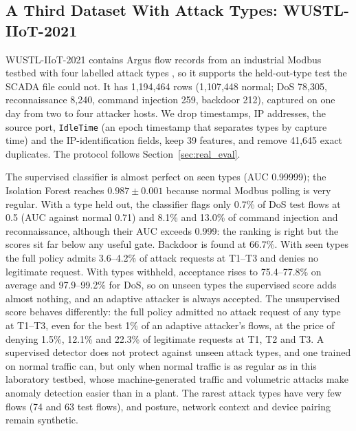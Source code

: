 \subsection{A Third Dataset With Attack Types: WUSTL-IIoT-2021}\label{sec:wustl21_eval}
WUSTL-IIoT-2021 contains Argus flow records from an industrial Modbus testbed with four labelled attack types \cite{zolanvari2019vulnerability,zolanvari2021wustl}, so it supports the held-out-type test the SCADA file could not. It has 1{,}194{,}464 rows (1{,}107{,}448 normal; DoS 78{,}305, reconnaissance 8{,}240, command injection 259, backdoor 212), captured on one day from two to four attacker hosts. We drop timestamps, IP addresses, the source port, \texttt{IdleTime} (an epoch timestamp that separates types by capture time) and the IP-identification fields, keep 39 features, and remove 41{,}645 exact duplicates. The protocol follows Section~\ref{sec:real_eval}.

The supervised classifier is almost perfect on seen types (AUC 0.99999); the Isolation Forest reaches $0.987\pm0.001$ because normal Modbus polling is very regular. With a type held out, the classifier flags only 0.7\% of DoS test flows at 0.5 (AUC against normal 0.71) and 8.1\% and 13.0\% of command injection and reconnaissance, although their AUC exceeds 0.999: the ranking is right but the scores sit far below any useful gate. Backdoor is found at 66.7\%. With seen types the full policy admits 3.6--4.2\% of attack requests at T1--T3 and denies no legitimate request. With types withheld, acceptance rises to 75.4--77.8\% on average and 97.9--99.2\% for DoS, so on unseen types the supervised score adds almost nothing, and an adaptive attacker is always accepted. The unsupervised score behaves differently: the full policy admitted no attack request of any type at T1--T3, even for the best 1\% of an adaptive attacker's flows, at the price of denying 1.5\%, 12.1\% and 22.3\% of legitimate requests at T1, T2 and T3. A supervised detector does not protect against unseen attack types, and one trained on normal traffic can, but only when normal traffic is as regular as in this laboratory testbed, whose machine-generated traffic and volumetric attacks make anomaly detection easier than in a plant. The rarest attack types have very few flows (74 and 63 test flows), and posture, network context and device pairing remain synthetic.

\begin{table}[t]
\centering
\caption{WUSTL-IIoT-2021: legitimate requests allowed and attack requests accepted (\%)}
\label{tab:wustl21}
\scriptsize
\setlength{\tabcolsep}{2.5pt}

\par\smallskip{}
\end{table}

